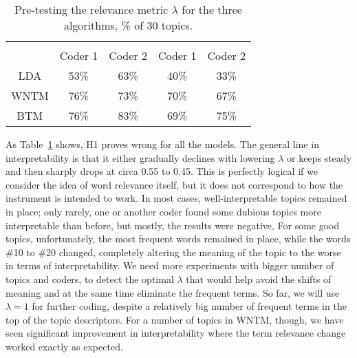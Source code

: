 \begin{table}[ht]%
	\centering
	\caption{Pre-testing the relevance metric \(\lambda\) for the three algorithms, \% of 30 topics.}%
	\label{tab:threeAlgorithmRelevance}%
		\begin{tabular}{ c  c  c  c  c }%
			\toprule
			\makecell[c]{Model} & \multicolumn{2}{c}{\makecell{\(\lambda = 1\)}} & \multicolumn{2}{c}{\makecell{\(\lambda = 0.5\)}} \\
			\cline{2-5}
			 & Coder 1 & Coder 2 & Coder 1 & Coder 2 \\
			 \hline
			 LDA & 53\% & 63\% & 40\% & 33\% \\
			 WNTM & 76\% & 73\% & 70\% & 67\%\\
			 BTM & 76\% & 83\% & 69\% & 75\% \\
			\bottomrule
		\end{tabular}%
\end{table}

As Table~\cref{tab:threeAlgorithmRelevance} shows, H1 proves wrong for all the models. The general line in interpretability is that it either gradually declines with lowering  \(\lambda\) or keeps steady and then sharply drops at circa 0.55 to 0.45. This is perfectly logical if we consider the idea of word relevance itself, but it does not correspond to how the instrument is intended to work. In most cases, well-interpretable topics remained in place; only rarely, one or another coder found some dubious topics more interpretable than before, but mostly, the results were negative, For some good topics, unfortunately, the most frequent words remained in place, while the words \#10 to \#20 changed, completely altering the meaning of the topic to the worse in terms of interpretability. We need more experiments with bigger number of topics and coders, to detect the optimal  \(\lambda\) that would help avoid the shifts of meaning and at the same time eliminate the frequent terms. So far, we will use \(\lambda = 1\) for further coding, despite a relatively big number of frequent terms in the top of the topic descriptors. For a number of topics in WNTM, though, we have seen significant improvement in interpretability where the term relevance change worked exactly as expected.

